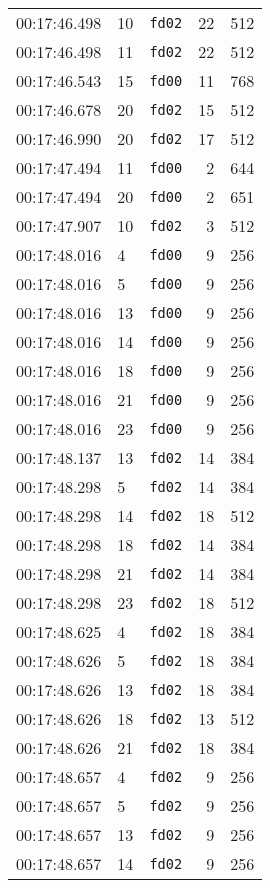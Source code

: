 \documentclass{article}
\begin{document}
\begin{longtable}{lllrr}
00:17:46.498 & 10 & \texttt{fd02} & 22 & 512 \\
00:17:46.498 & 11 & \texttt{fd02} & 22 & 512 \\
00:17:46.543 & 15 & \texttt{fd00} & 11 & 768 \\
00:17:46.678 & 20 & \texttt{fd02} & 15 & 512 \\
00:17:46.990 & 20 & \texttt{fd02} & 17 & 512 \\
00:17:47.494 & 11 & \texttt{fd00} & 2 & 644 \\
00:17:47.494 & 20 & \texttt{fd00} & 2 & 651 \\
00:17:47.907 & 10 & \texttt{fd02} & 3 & 512 \\
00:17:48.016 & 4 & \texttt{fd00} & 9 & 256 \\
00:17:48.016 & 5 & \texttt{fd00} & 9 & 256 \\
00:17:48.016 & 13 & \texttt{fd00} & 9 & 256 \\
00:17:48.016 & 14 & \texttt{fd00} & 9 & 256 \\
00:17:48.016 & 18 & \texttt{fd00} & 9 & 256 \\
00:17:48.016 & 21 & \texttt{fd00} & 9 & 256 \\
00:17:48.016 & 23 & \texttt{fd00} & 9 & 256 \\
00:17:48.137 & 13 & \texttt{fd02} & 14 & 384 \\
00:17:48.298 & 5 & \texttt{fd02} & 14 & 384 \\
00:17:48.298 & 14 & \texttt{fd02} & 18 & 512 \\
00:17:48.298 & 18 & \texttt{fd02} & 14 & 384 \\
00:17:48.298 & 21 & \texttt{fd02} & 14 & 384 \\
00:17:48.298 & 23 & \texttt{fd02} & 18 & 512 \\
00:17:48.625 & 4 & \texttt{fd02} & 18 & 384 \\
00:17:48.626 & 5 & \texttt{fd02} & 18 & 384 \\
00:17:48.626 & 13 & \texttt{fd02} & 18 & 384 \\
00:17:48.626 & 18 & \texttt{fd02} & 13 & 512 \\
00:17:48.626 & 21 & \texttt{fd02} & 18 & 384 \\
00:17:48.657 & 4 & \texttt{fd02} & 9 & 256 \\
00:17:48.657 & 5 & \texttt{fd02} & 9 & 256 \\
00:17:48.657 & 13 & \texttt{fd02} & 9 & 256 \\
00:17:48.657 & 14 & \texttt{fd02} & 9 & 256 \\

\end{longtable}
\end{document}
